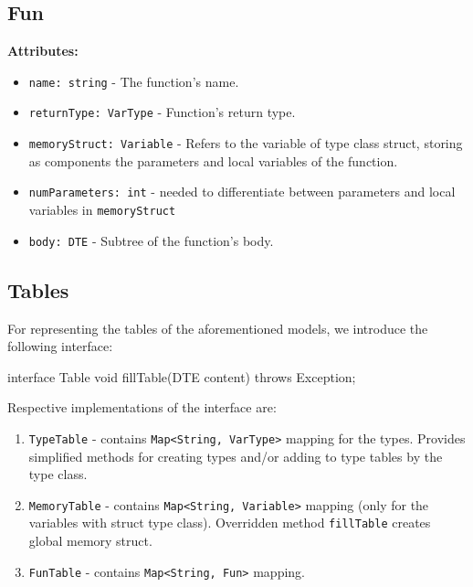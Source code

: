 \subsection{Fun}\label{subsec:fun}
\textbf{Attributes:}
\begin{itemize}
    \item \verb+name: string+ - The function's name.
    \item \verb+returnType: VarType+ - Function's return type.
    \item \verb+memoryStruct: Variable+ - Refers to the variable of type class struct, storing as components the parameters
    and local variables of the function.
    \item \verb+numParameters: int+ - needed to differentiate between parameters and local variables in \verb+memoryStruct+
    \item \verb+body: DTE+ - Subtree of the function's body.
\end{itemize}

\subsection{Tables}\label{subsec:tables}
For representing the tables of the aforementioned models, we introduce the following interface:
\begin{codeblock}[Table]
    interface Table {
        void fillTable(DTE content) throws Exception;
    }
\end{codeblock}
Respective implementations of the interface are:
\begin{enumerate}
    \item \verb+TypeTable+ - contains \verb+Map<String, VarType>+ mapping for the types.
    Provides simplified methods for creating types and/or adding to type tables by the type class.
    \item \verb+MemoryTable+ - contains \verb+Map<String, Variable>+ mapping (only for the variables with struct type class).
    Overridden method \verb+fillTable+ creates global memory struct.
    \item \verb+FunTable+ - contains \verb+Map<String, Fun>+ mapping.
\end{enumerate}


